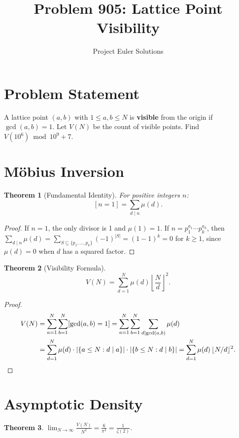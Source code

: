 \documentclass[11pt]{article}
\title{Problem 905: Lattice Point Visibility}
\author{Project Euler Solutions}
\date{}
\newtheorem{theorem}{Theorem}
\begin{document}
\maketitle

\section{Problem Statement}

A lattice point $(a,b)$ with $1 \le a,b \le N$ is \textbf{visible} from the origin if $\gcd(a,b)=1$. Let $V(N)$ be the count of visible points. Find $V(10^6) \bmod 10^9+7$.

\section{M\"obius Inversion}

\begin{theorem}[Fundamental Identity]
For positive integers $n$:
\[
[n = 1] = \sum_{d \mid n} \mu(d).
\]
\end{theorem}

\begin{proof}
If $n = 1$, the only divisor is 1 and $\mu(1) = 1$. If $n = p_1^{a_1} \cdots p_k^{a_k}$, then $\sum_{d \mid n} \mu(d) = \sum_{S \subseteq \{p_1,\ldots,p_k\}} (-1)^{|S|} = (1-1)^k = 0$ for $k \ge 1$, since $\mu(d) = 0$ when $d$ has a squared factor.
\end{proof}

\begin{theorem}[Visibility Formula]
\[
V(N) = \sum_{d=1}^{N} \mu(d) \left\lfloor \frac{N}{d} \right\rfloor^2.
\]
\end{theorem}

\begin{proof}
\begin{align*}
V(N) &= \sum_{a=1}^{N}\sum_{b=1}^{N} [\gcd(a,b) = 1] = \sum_{a=1}^{N}\sum_{b=1}^{N}\sum_{d \mid \gcd(a,b)} \mu(d) \\
     &= \sum_{d=1}^{N} \mu(d) \cdot |\{a \le N : d \mid a\}| \cdot |\{b \le N : d \mid b\}| = \sum_{d=1}^{N} \mu(d)\,\lfloor N/d \rfloor^2. \qedhere
\end{align*}
\end{proof}

\section{Asymptotic Density}

\begin{theorem}
$\displaystyle \lim_{N \to \infty} \frac{V(N)}{N^2} = \frac{6}{\pi^2} = \frac{1}{\zeta(2)}$.
\end{theorem}
\end{document}

